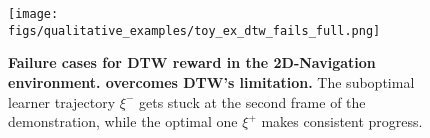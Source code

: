 \begin{figure}
    \centering
    \texttt{[image: figs/qualitative\_examples/toy\_ex\_dtw\_fails\_full.png]}
    \caption{\small \textbf{Failure cases for DTW reward in the 2D-Navigation environment. \orca{} overcomes DTW's limitation.} The suboptimal learner trajectory $\xi^-$ gets stuck at the second frame of the demonstration, while the optimal one $\xi^+$ makes consistent progress.}
    \label{fig:dtw_fail_full}
\end{figure}